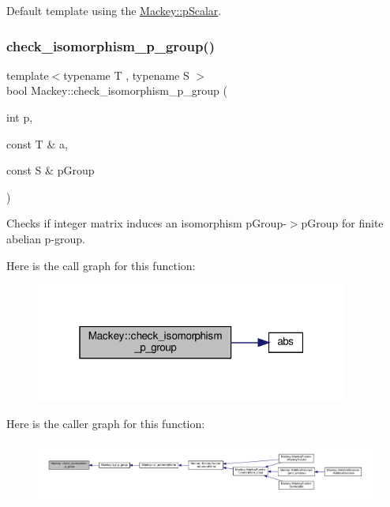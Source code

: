 Default template using the \hyperlink{namespaceMackey_a4f147e328c520f568f5d3adf1c75f514}{Mackey\+::p\+Scalar}. \mbox{\label{namespaceMackey_aa96cf972d89b207ce6709e867f760f37}} 
\subsubsection{\texorpdfstring{check\+\_\+isomorphism\+\_\+p\+\_\+group()}{check\_isomorphism\_p\_group()}}
{\footnotesize\ttfamily template$<$typename T , typename S $>$ \\
bool Mackey\+::check\+\_\+isomorphism\+\_\+p\+\_\+group (\begin{DoxyParamCaption}\item[{int}]{p,  }\item[{const T \&}]{a,  }\item[{const S \&}]{p\+Group }\end{DoxyParamCaption})}



Checks if integer matrix induces an isomorphism p\+Group-\/$>$p\+Group for finite abelian p-\/group. 

Here is the call graph for this function\+:\nopagebreak
\begin{figure}[H]
\begin{center}
\leavevmode
\includegraphics[width=292pt]{namespaceMackey_aa96cf972d89b207ce6709e867f760f37_cgraph}
\end{center}
\end{figure}
Here is the caller graph for this function\+:\nopagebreak
\begin{figure}[H]
\begin{center}
\leavevmode
\includegraphics[width=350pt]{namespaceMackey_aa96cf972d89b207ce6709e867f760f37_icgraph}
\end{center}
\end{figure}
\mbox{\label{namespaceMackey_a3a4b7761ed7274b145eed9a451b53e61}} 
